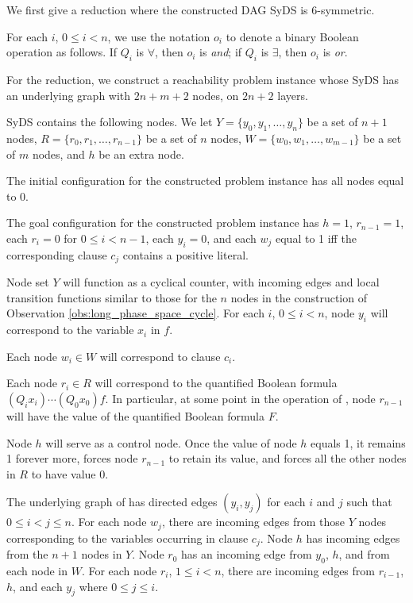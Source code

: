 We first give a reduction where the constructed DAG SyDS is 6-symmetric.

For each $i$, $0 \leq i <n$,
 we use the notation $o_i$ to denote a binary Boolean operation as follows.
 If $Q_i$ is $\forall$, then $o_i$ is {\em and};
 if $Q_i$ is $\exists$, then $o_i$ is {\em or}.

For the reduction, we construct a reachability problem instance whose SyDS \cals{} 
has an underlying graph with $2n+m+2$ nodes, on $2n+2$ layers. 

SyDS \cals{} contains the following nodes.
We let $Y = \{y_0, y_1, \dots , y_n\}$ be a set of $n+1$ nodes,
$R = \{r_0, r_1, \dots , r_{n-1}\}$ be a set of $n$ nodes,
$W = \{w_0, w_1, \dots , w_{m-1}\}$ be a set of $m$ nodes,
 and $h$ be an extra node.
 
The initial configuration \calc{} for the constructed problem instance
 has all nodes equal to 0.

The goal configuration \cald{} for the constructed problem instance 
has $h =1$, $r_{n-1} = 1$,  each  $r_i= 0$ for $0 \leq i  < n-1$, 
each  $y_i= 0$, 
and each $w_j$ equal to 1 iff the corresponding clause $c_j$ contains a positive literal.

Node set $Y$ will function as a cyclical counter,
with incoming edges and local transition functions similar to those for
the $n$ nodes in the construction of Observation \ref{obs:long_phase_space_cycle}.
For each $i$, $0 \leq i < n$,
node $y_i$ will correspond to the variable $x_i$ in $f$.

Each node $w_i \in W$ will correspond to clause $c_i$.

Each node $r_i \in R$ will correspond to the quantified Boolean formula
$(Q_i x_i) \cdots  (Q_0 x_0) f$.
In particular, at some point in the operation of \cals{},
node $r_{n-1}$ will have the value of the quantified Boolean formula $F$.

Node $h$ will serve as a control node.
Once the value of node $h$ equals 1,  it remains 1 forever more,
forces node $r_{n-1}$ to retain its value, and forces all the other nodes in $R$ to have value 0.

The underlying graph of \cals{} has directed edges
$(y_i, y_j)$ for each $i$ and $j$ such that $0 \leq i < j \leq n$.
For each node $w_j$, there are incoming edges from those $Y$ nodes
corresponding to the variables occurring in clause $c_j$.
Node $h$ has incoming edges from the $n+1$ nodes in $Y$.
Node $r_0$ has an incoming edge from $y_0$, $h$, and from each node in $W$.
For each node $r_i$, $1 \leq i < n$,
there are incoming edges from $r_{i-1}$, $h$, and each $y_j$ where $0 \leq j \leq i$.


